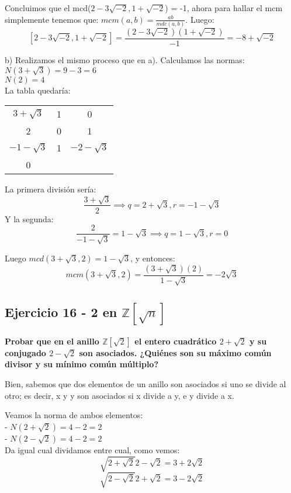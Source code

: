 \documentclass[11pt, a4paper, titlepage]{article}
\providecommand{\ent}{\mathbb{Z}}
\begin{document}
Concluimos que el mcd($2-3\sqrt{-2},1+\sqrt{-2}$) = -1, ahora para hallar el mcm simplemente tenemos que: $ mcm(a,b) = \frac{ab}{mdc(a,b)} $. Luego:
$$ [2-3\sqrt{-2},1+\sqrt{-2}] = \frac{(2-3\sqrt{-2})(1+\sqrt{-2})}{-1} = -8+\sqrt{-2} $$

b) Realizamos el mismo proceso que en a). Calculamos las normas: \\
$ N(3+\sqrt{3}) = 9 - 3 = 6 $ \\
$ N(2) = 4 $ \\

La tabla quedaría:

\begin{center}
\begin{tabular}{c|cc}
$ 3+\sqrt{3} $ & 1 & 0 \\
2 & 0 & 1 \\
\hline
$ -1-\sqrt{3} $ & 1 & $ -2-\sqrt{3}$ \\
\hline
0
\end{tabular}
\end{center}

La primera división sería:
$$ \frac{3+\sqrt{3}}{2} \implies q = 2+\sqrt{3}, r = -1-\sqrt{3} $$
Y la segunda:
$$ \frac{2}{-1-\sqrt{3}} = 1-\sqrt{3} \implies q = 1-\sqrt{3}, r = 0 $$

Luego $ mcd(3+\sqrt{3},2) = 1-\sqrt{3} $, y entonces:
$$ mcm(3+\sqrt{3},2) = \frac{(3+\sqrt{3})(2)}{1-\sqrt{3}} = -2\sqrt{3} $$

\subsection{\LARGE{Ejercicio 16 - 2 en $\ent [\sqrt{n}]$}}

\textbf{Probar que en el anillo $\ent[\sqrt{2}]$ el entero cuadrático $2+\sqrt{2}$ y su conjugado $2-\sqrt{2}$ son asociados.
¿Quiénes son su máximo común divisor y su mínimo común múltiplo?}

Bien, sabemos que dos elementos de un anillo son asociados si uno se divide al otro; es decir, x y y son asociados si x divide a y,
e y divide a x.

Veamos la norma de ambos elementos: \\
- $N(2+\sqrt{2}) = 4 - 2 = 2 $ \\
- $N(2-\sqrt{2}) = 4 - 2 = 2 $ \\

Da igual cual dividamos entre cual, como vemos:
$$ \sqrt{2+\sqrt{2}}{2-\sqrt{2}} = 3+2\sqrt{2} $$
$$ \sqrt{2-\sqrt{2}}{2+\sqrt{2}} = 3-2\sqrt{2} $$
\end{document}
